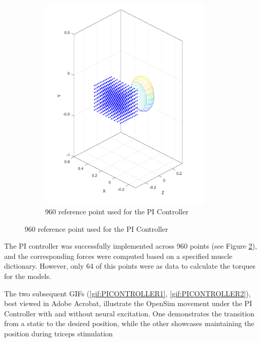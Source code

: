 \begin{figure}[h!]
\begin{subfigure}[b]{0.45\linewidth}
    \end{subfigure}
    \hfill
    \begin{subfigure}[b]{0.45\linewidth}            
        \includegraphics[width=0.9\textwidth]{Pictures/Results/960points.png}
        \caption{960 reference point used for the PI Controller}
        \label{fig:960}
    \end{subfigure}
\end{figure}


The PI controller was successfully implemented across 960 points (see Figure \ref{fig:960}), and the corresponding forces were computed based on a specified muscle dictionary. However, only 64 of this points were as data to calculate the torques for the models.

The two subsequent GIFs (\ref{gif:PICONTROLLER1}, \ref{gif:PICONTROLLER2}), best viewed in Adobe Acrobat, illustrate the OpenSim movement under the PI Controller with and without neural excitation. One demonstrates the transition from a static to the desired position, while the other showcases maintaining the position during triceps stimulation

